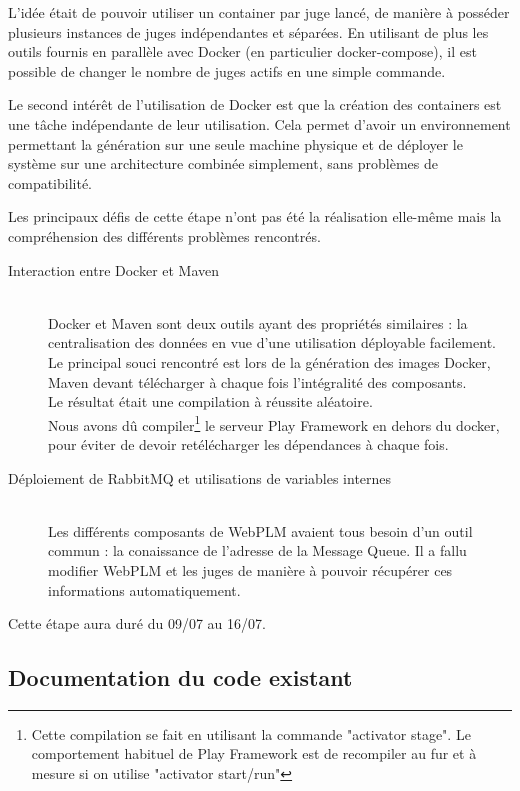 \documentclass[stage]{tnreport}
\begin{document}
L'idée était de pouvoir utiliser un container par juge lancé, de manière à posséder plusieurs instances de juges indépendantes et séparées. En utilisant de plus les outils fournis en parallèle avec Docker (en particulier docker-compose), il est possible de changer le nombre de juges actifs en une simple commande.

Le second intérêt de l'utilisation de Docker est que la création des containers est une tâche indépendante de leur utilisation. Cela permet d'avoir un environnement permettant la génération sur une seule machine physique et de déployer le système sur une architecture combinée simplement, sans problèmes de compatibilité.

Les principaux défis de cette étape n'ont pas été la réalisation elle-même mais la compréhension des différents problèmes rencontrés.

\begin{description}
	\item[Interaction entre Docker et Maven] \hfill \\
		Docker et Maven sont deux outils ayant des propriétés similaires : la centralisation des données en vue d'une utilisation déployable facilement. Le principal souci rencontré est lors de la génération des images Docker, Maven devant télécharger à chaque fois l'intégralité des composants.
		\hfill \\
		Le résultat était une compilation à réussite aléatoire. \hfill \\
		Nous avons dû compiler\footnote{Cette compilation se fait en utilisant la commande "activator stage". Le comportement habituel de Play Framework est de recompiler au fur et à mesure si on utilise "activator start/run"} le serveur Play Framework en dehors du docker, pour éviter de devoir retélécharger les dépendances à chaque fois.
	\item[Déploiement de RabbitMQ et utilisations de variables internes] \hfill \\
		Les différents composants de WebPLM avaient tous besoin d'un outil commun : la conaissance de l'adresse de la Message Queue. Il a fallu modifier WebPLM et les juges de manière à pouvoir récupérer ces informations automatiquement.
\end{description}

Cette étape aura duré du 09/07 au 16/07.

\subsection{Documentation du code existant}
\end{document}
